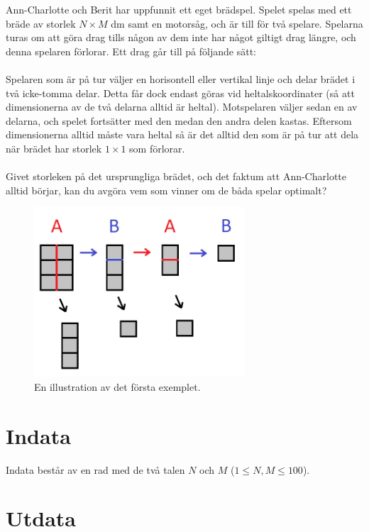 
Ann-Charlotte och Berit har uppfunnit ett eget brädspel. Spelet spelas med ett
bräde av storlek $N \times M$ dm samt en motorsåg, och är till för två spelare.
Spelarna turas om att göra drag tills någon av dem inte har något giltigt drag
längre, och denna spelaren förlorar. Ett drag går till på följande sätt:
\\\\
Spelaren som är på tur väljer en horisontell eller vertikal linje och delar
brädet i två icke-tomma delar. Detta får dock endast göras vid heltalskoordinater (så att
dimensionerna av de två delarna alltid är heltal). Motspelaren väljer sedan en av
delarna, och spelet fortsätter med den medan den andra delen kastas. Eftersom
dimensionerna alltid måste vara heltal så är det alltid den som är på tur att
dela när brädet har storlek $1 \times 1$ som förlorar.
\\\\
Givet storleken på det ursprungliga brädet, och det faktum att Ann-Charlotte
alltid börjar, kan du avgöra vem som vinner om de båda spelar optimalt?

\begin{figure}[ht!]
\centering
\includegraphics[width=0.7\textwidth]{bradspelet.png}
\caption{En illustration av det första exemplet.}
\label{overflow}
\end{figure}

\section*{Indata}
Indata består av en rad med de två talen $N$ och $M$ ($1 \le N,M \le 100$).

\section*{Utdata}

